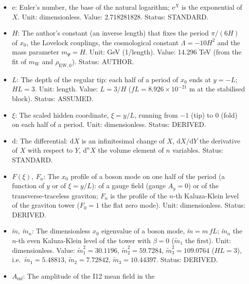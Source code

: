 \documentclass[
  10pt,
]{article}
\begin{document}
\begin{itemize}
  \(\Upsilon(\xi)\): The factor by which the scalar density of the dark
  matter changes the gauge kinetic term along \(x_0\) (I12),
  \(\Upsilon = 1 + A_{\mathrm{mf}}n^{\mathrm{sc}}_{\mathrm{DM}}\). Unit:
  dimensionless. Status: DERIVED.
\item
  \(\mathrm{e}\): Euler's number, the base of the natural logarithm;
  \(\mathrm{e}^{X}\) is the exponential of \(X\). Unit: dimensionless.
  Value: 2.718281828. Status: STANDARD.
\item
  \(H\): The author's constant (an inverse length) that fixes the period
  \(\pi/(6H)\) of \(x_0\), the Lovelock couplings, the cosmological
  constant \(\Lambda = -10H^2\) and the mass parameter \(m_\Psi = H\).
  Unit: GeV (1/length). Value: 14.296 TeV (from the fit of
  \(m_{\mathrm{W}}\) and \(\rho_{\mathrm{EW},0}\)). Status: AUTHOR.
\item
  \(L\): The depth of the regular tip: each half of a period of \(x_0\)
  ends at \(y = -L\); \(HL = 3\). Unit: length. Value: \(L = 3/H\)
  (\(fL = 8.926\times10^{-21}\) m at the stabilised block). Status:
  ASSUMED.
\item
  \(\xi\): The scaled hidden coordinate, \(\xi = y/L\), running from
  \(-1\) (tip) to \(0\) (fold) on each half of a period. Unit:
  dimensionless. Status: DERIVED.
\item
  \(\mathrm{d}\): The differential: \(\mathrm{d}X\) is an infinitesimal
  change of \(X\), \(\mathrm{d}X/\mathrm{d}Y\) the derivative of \(X\)
  with respect to \(Y\), \(\mathrm{d}^nX\) the volume element of \(n\)
  variables. Status: STANDARD.
\item
  \(F(\xi),\ F_n\): The \(x_0\) profile of a boson mode on one half of
  the period (a function of \(y\) or of \(\xi = y/L\)): of a gauge field
  (gauge \(A_y = 0\)) or of the transverse-traceless graviton; \(F_n\)
  is the profile of the \(n\)-th Kaluza-Klein level of the graviton
  tower (\(F_0 = 1\) the flat zero mode). Unit: dimensionless. Status:
  DERIVED.
\item
  \(\tilde m,\ \tilde m_n\): The dimensionless \(x_0\) eigenvalue of a
  boson mode, \(\tilde m = m\,fL\); \(\tilde m_n\) the \(n\)-th even
  Kaluza-Klein level of the tower with \(\beta = 0\) (\(\tilde m_1\) the
  first). Unit: dimensionless. Value: \(\tilde m_1^2 = 30.1196\),
  \(\tilde m_2^2 = 59.7284\), \(\tilde m_3^2 = 109.0764\) (\(HL = 3\)),
  i.e.~\(\tilde m_1 = 5.48813\), \(\tilde m_2 = 7.72842\),
  \(\tilde m_3 = 10.44397\). Status: DERIVED.
\item
  \(A_{\mathrm{mf}}\): The amplitude of the I12 mean field in the

\end{itemize}
\end{document}
